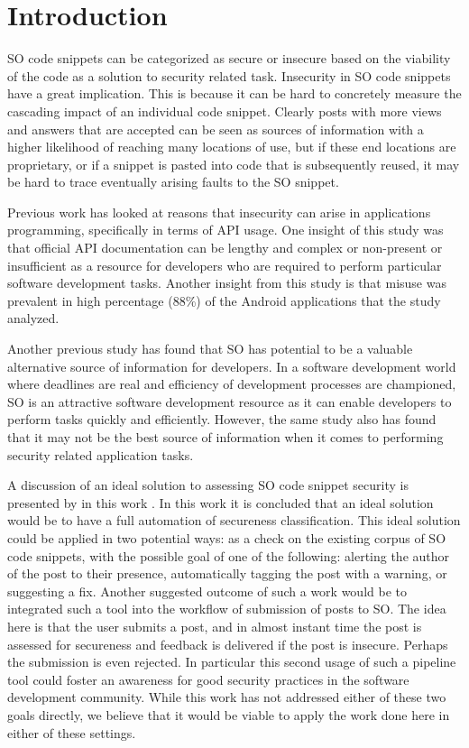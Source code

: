 \documentclass[10pt, conference]{IEEEtran}
\begin{document}
\section{Introduction}
SO code snippets can be categorized as secure or insecure based on the viability of the code as a solution to security related task. Insecurity in SO code snippets have a great implication. This is because it can be hard to concretely measure the cascading impact of an individual code snippet. 
Clearly posts with more views and answers that are accepted can be seen as sources of information with a higher likelihood of reaching many locations of use, but if  these end locations are proprietary, or if a snippet is pasted into code that is subsequently reused, it may be hard to trace eventually arising faults to the SO snippet.

Previous work \cite{Egele:2013:ESC:2508859.2516693} has looked at reasons that insecurity can arise in applications programming, specifically in terms of API usage. One insight of this study was that official API documentation can be lengthy and complex or non-present or insufficient as a resource for developers who are required to perform particular software development tasks. Another insight from this study is that misuse was prevalent in high percentage (88\%) of the Android applications that the study analyzed. 

Another previous study \cite{7546508} has found that SO has potential to be a valuable alternative source of information for developers. In a software development world where deadlines are real and efficiency of development processes are championed, SO is an attractive software development resource as it can enable developers to perform tasks quickly and efficiently. However, the same study also has found that it may not be the best source of information when it comes to performing security related application tasks.


A discussion of an ideal solution to assessing SO code snippet security is presented by in this work \cite{DBLP:journals/corr/abs-1901-01327}. In this work it is concluded that an ideal solution would be to have a full automation of secureness classification. This ideal solution could be applied in two potential ways: as a check on the existing corpus of SO code snippets, with the possible goal of one of the following: alerting the author of the post to their presence, automatically tagging the post with a warning, or suggesting a fix. Another suggested outcome of such a work would be to integrated such a tool into the workflow of submission of posts to SO. The idea here is that the user submits a post, and in almost instant time the post is assessed for secureness and feedback is delivered if the post is insecure. Perhaps the submission is even rejected. In particular this second usage of such a pipeline tool could foster an awareness for good security practices in the software development community. While this work has not addressed either of these two goals directly, we believe that it would be viable to apply the work done here in either of these settings.
\end{document}

